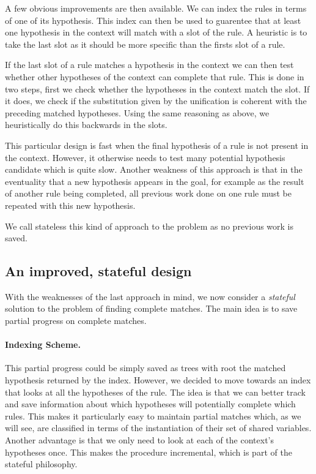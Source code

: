\documentclass[runningheads]{llncs}
\begin{document}
A few obvious improvements are then available.
We can index the rules in terms of one of its hypothesis.
This index can then be used to guarentee that at least one hypothesis in the context will match with a slot of the rule.
A heuristic is to take the last slot as it should be more specific than the firsts slot of a rule.

If the last slot of a rule matches a hypothesis in the context we can then test whether other hypotheses of the context can complete that rule.
This is done in two steps, first we check whether the hypotheses in the context match the slot.
If it does, we check if the substitution given by the unification is coherent with the preceding matched hypotheses.
Using the same reasoning as above, we heuristically do this backwards in the slots.

This particular design is fast when the final hypothesis of a rule is not present in the context. 
However, it otherwise needs to test many potential hypothesis candidate which is quite slow.
Another weakness of this approach is that in the eventuality that a new hypothesis appears in the goal, for example as the result of another rule being completed, all previous work done on one rule must be repeated with this new hypothesis.

We call stateless this kind of approach to the problem as no previous work is saved.

\subsection{An improved, stateful design}

With the weaknesses of the last approach in mind, we now consider a \textit{stateful} solution to the problem of finding complete matches.
The main idea is to save partial progress on complete matches.

\paragraph{Indexing Scheme.}
This partial progress could be simply saved as trees with root the matched hypothesis returned by the index.
However, we decided to move towards an index that looks at all the hypotheses of the rule.
The idea is that we can better track and save information about which hypotheses will potentially complete which rules.
This makes it particularly easy to maintain partial matches which, as we will see, are classified in terms of the instantiation of their set of shared variables.
Another advantage is that we only need to look at each of the context's hypotheses once.
This makes the procedure incremental, which is part of the stateful philosophy.
\end{document}
